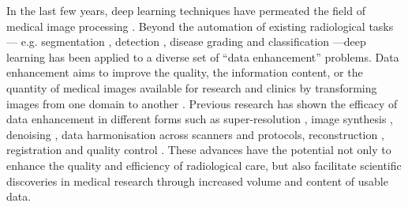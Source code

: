 
In the last few years, deep learning techniques have permeated the field of medical image processing \cite{shen2017deep,litjens2017survey}. Beyond the automation of existing radiological tasks--- e.g. segmentation \cite{kamnitsas2017efficient}, detection \cite{roth2014new}, disease grading and classification \cite{araujo2017classification}---deep learning has been applied to a diverse set of ``data enhancement'' problems. Data enhancement aims to improve the quality, the information content, or the quantity of medical images available for research and clinics by transforming images from one domain to another \cite{isola2017image}. Previous research has shown the efficacy of data enhancement in different forms such as super-resolution \cite{oktay2016multi,chen2018efficient,ravi2019adversarial}, image synthesis \cite{nie2016estimating,kang2017deep}, denoising \cite{benou2017ensemble,chen2017low}, data harmonisation \cite{karayumak2018harmonizing,tax2019cross} across scanners and protocols, reconstruction \cite{sun2016deep,jin2017deep,hammernik2018learning,schlemper2018deep,zhu2018image,yang2018dagan,yoon2019efficient}, registration \cite{sokooti2017nonrigid,balakrishnan2018unsupervised} and quality control \cite{wu2017fuiqa,esses2018automated}.  These advances have the potential not only to enhance the quality and efficiency of radiological care, but also facilitate scientific discoveries in medical research through increased volume and content of usable data. 

